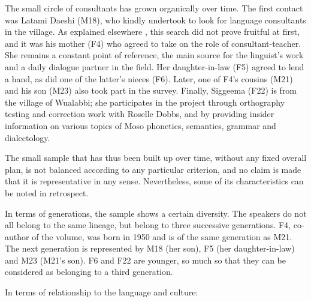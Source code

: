 The small circle of consultants has grown organically over time. The first contact was Latami Daeshi (M18), who kindly undertook to look for language consultants in the village. As explained elsewhere \parencite[28-29]{michaud2017}, this search did not prove fruitful at first, and it was his mother (F4) who agreed to take on the role of consultant-teacher. She remains a constant point of reference, the main source for the linguist's work and a daily dialogue partner in the field. Her daughter-in-law (F5) agreed to lend a hand, as did one of the latter's nieces (F6). Later, one of F4's cousins (M21) and his son (M23) also took part in the survey.
Finally, Siggeema (F22) is from the village of Wualabbi; she participates in the project through orthography testing and correction work with Roselle Dobbs, and by providing insider information on various topics of Moso phonetics, semantics, grammar and dialectology.

The small sample that has thus been built up over time, without any fixed overall plan, is not balanced according to any particular criterion, and no claim is made that it is representative in any sense. Nevertheless, some of its characteristics can be noted in retrospect.

In terms of generations, the sample shows a certain diversity. The speakers do not all belong to the same lineage, but belong to three successive generations. F4, co-author of the volume, was born in 1950 and is of the same generation as M21. The next generation is represented by M18 (her son), F5 (her daughter-in-law) and M23 (M21's son). F6 and F22 are younger, so much so that they can be considered as belonging to a third generation.

In terms of relationship to the language and culture:

